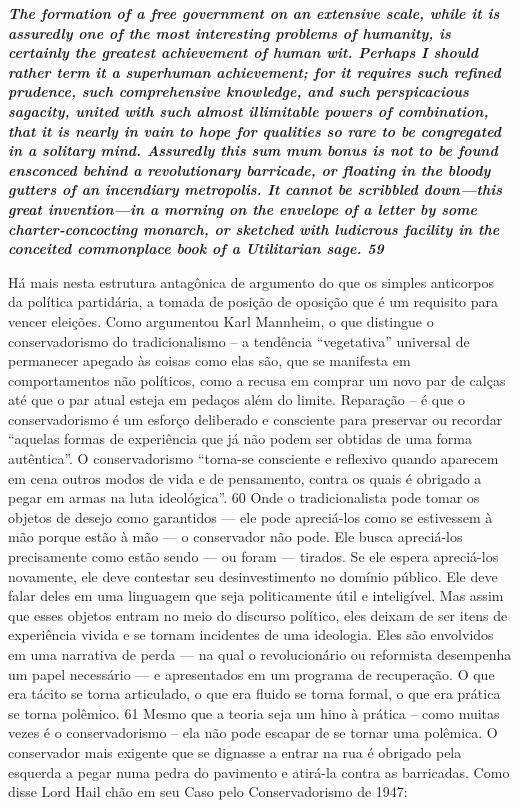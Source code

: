  \textbf{\textit{The formation of a free government on an extensive scale, while it is assuredly one of the most interesting problems of humanity, is certainly the greatest achievement of human wit. Perhaps I should rather term it a superhuman achievement; for it requires such refined prudence, such comprehensive knowledge, and such perspicacious sagacity, united with such almost illimitable powers of combination, that it is nearly in vain to hope for qualities so rare to be congregated in a solitary mind. Assuredly this sum mum bonus is not to be found ensconced behind a revolutionary barricade, or floating in the bloody gutters of an incendiary metropolis. It cannot be scribbled down—this great invention—in a morning on the envelope of a letter by some charter-concocting monarch, or sketched with ludicrous facility in the conceited commonplace book of a Utilitarian sage. {{\color{blue} 59} } } }  
 
 
\par
 
Há mais nesta estrutura antagônica de argumento do que os simples anticorpos da política partidária, a tomada de posição de oposição que é um requisito para vencer eleições. Como argumentou Karl Mannheim, o que distingue o conservadorismo do tradicionalismo – a tendência “vegetativa” universal de permanecer apegado às coisas como elas são, que se manifesta em comportamentos não políticos, como a recusa em comprar um novo par de calças até que o par atual esteja em pedaços além do limite. Reparação – é que o conservadorismo é um esforço deliberado e consciente para preservar ou recordar “aquelas formas de experiência que já não podem ser obtidas de uma forma autêntica”. O conservadorismo “torna-se consciente e reflexivo quando aparecem em cena outros modos de vida e de pensamento, contra os quais é obrigado a pegar em armas na luta ideológica”.
 {\color{blue} 60}  
Onde o tradicionalista pode tomar os objetos de desejo como garantidos — ele pode apreciá-los como se estivessem à mão porque estão à mão — o conservador não pode. Ele busca apreciá-los precisamente como estão sendo — ou foram — tirados. Se ele espera apreciá-los novamente, ele deve contestar seu desinvestimento no domínio público. Ele deve falar deles em uma linguagem que seja politicamente útil e inteligível. Mas assim que esses objetos entram no meio do discurso político, eles deixam de ser itens de experiência vivida e se tornam incidentes de uma ideologia. Eles são envolvidos em uma narrativa de perda — na qual o revolucionário ou reformista desempenha um papel necessário — e apresentados em um programa de recuperação. O que era tácito se torna articulado, o que era fluido se torna formal, o que era prática se torna polêmico.
 {\color{blue} 61}  
Mesmo que a teoria seja um hino à prática – como muitas vezes é o conservadorismo – ela não pode escapar de se tornar uma polêmica. O conservador mais exigente que se dignasse a entrar na rua é obrigado pela esquerda a pegar numa pedra do pavimento e atirá-la contra as barricadas. Como disse Lord Hail chão em seu Caso pelo Conservadorismo de 1947:
 
